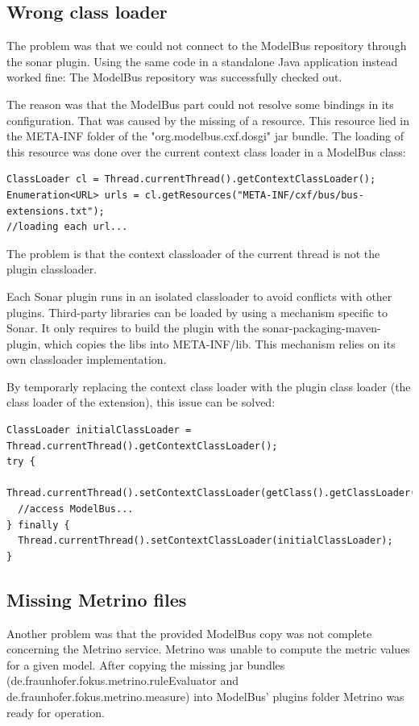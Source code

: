 \subsection{Wrong class loader}
The problem was that we could not connect to the ModelBus repository
through the sonar plugin. Using the same code in a standalone Java
application instead worked fine: The ModelBus repository was
successfully checked out.

The reason was that the ModelBus part could not resolve some bindings
in its configuration. That was caused by the missing of a
resource. This resource lied in the META-INF folder of the
"org.modelbus.cxf.dosgi" jar bundle. The loading of this resource was
done over the current context class loader in a ModelBus class:

\begin{verbatim}
ClassLoader cl = Thread.currentThread().getContextClassLoader();
Enumeration<URL> urls = cl.getResources("META-INF/cxf/bus/bus-extensions.txt");
//loading each url...
\end{verbatim}

The problem is that the context classloader of the current thread is
not the plugin classloader.

Each Sonar plugin runs in an isolated classloader to avoid conflicts
with other plugins. Third-party libraries can be loaded by using a
mechanism specific to Sonar. It only requires to build the plugin with
the sonar-packaging-maven-plugin, which copies the libs into
META-INF/lib. This mechanism relies on its own classloader
implementation.

By temporarly replacing the context class loader with the plugin class loader (the class loader of the extension), this issue can be solved:
\begin{verbatim}
ClassLoader initialClassLoader = Thread.currentThread().getContextClassLoader();
try {
  Thread.currentThread().setContextClassLoader(getClass().getClassLoader());
  //access ModelBus...
} finally {
  Thread.currentThread().setContextClassLoader(initialClassLoader);
}
\end{verbatim}

\subsection{Missing Metrino files}
Another problem was that the provided ModelBus copy was not complete
concerning the Metrino service. Metrino was unable to compute the
metric values for a given model. After copying the missing jar bundles
(de.fraunhofer.fokus.metrino.ruleEvaluator and
de.fraunhofer.fokus.metrino.measure) into ModelBus' plugins folder
Metrino was ready for operation.

